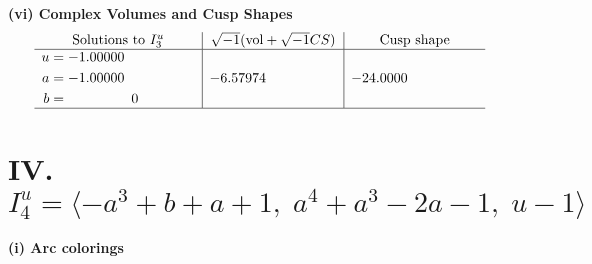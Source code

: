 \documentclass[1p]{elsarticle_modified}
\theoremstyle{definition}
\newcommand{\I}{\sqrt{-1}}
\begin{document}
\newpage\flushleft \textbf{(vi) Complex Volumes and Cusp Shapes}
$$\begin{array}{c|c|c}  
\text{Solutions to }I^u_{3}& \I (\text{vol} + \sqrt{-1}CS) & \text{Cusp shape}\\
 \hline 
\begin{aligned}
u &= -1.00000\phantom{ +0.000000I} \\
a &= -1.00000\phantom{ +0.000000I} \\
b &= \phantom{-0.000000 } 0\end{aligned}
 & -6.57974\phantom{ +0.000000I} & -24.0000\phantom{ +0.000000I}\\
 \hline 
 \end{array}$$\newpage\newpage\renewcommand{\arraystretch}{1}
\centering \section*{IV. $I^u_{4}= \langle - a^3+b+a+1,\;a^4+a^3-2 a-1,\;u-1 \rangle$}
\flushleft \textbf{(i) Arc colorings}\\
\end{document}
